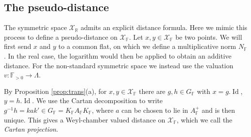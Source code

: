 \documentclass[12pt]{amsart}
\newcommand{\F}{\mathbb{F} }
\newcommand{\R}{\mathbb{R} }
\newcommand{\X}{\mathcal{X}}
\newcommand{\Ap}{A^+}
\newcommand{\ApF}{A_\F^+}
\newcommand{\Id}{\operatorname{Id} }
\numberwithin{equation}{section}
\theoremstyle{remark} %
\begin{document}
\subsection{The pseudo-distance}\label{sec:pseudodistance}

The symmetric space $\X_\R$ admits an explicit distance formula. Here we mimic this process to define a pseudo-distance on $\X_\F$. Let $x,y \in \X_\F$ be two points. We will first send $x$ and $y$ to a common flat, on which we define a multiplicative norm $N_\F$. In the real case, the logarithm would then be applied to obtain an additive distance. For the non-standard symmetric space we instead use the valuation $v \colon \F_{>0} \to \Lambda$.

By Proposition \ref{prop:trans}(a), for $x,y \in \X_\F$ there are $g,h\in G_\F$ with $x=g.\Id$, $y=h.\Id$. We use the Cartan decomposition \cite[Theorem \ref{I-thm:KAK}]{AppAGRCF} to write $g^{-1}h = kak' \in G_\F = K_\F A_\F K_\F$, where $a$ can be chosen to lie in $A_\F^+$ and is then unique. This gives a Weyl-chamber valued distance on $\X_\F$, which we call the \emph{Cartan projection}. 

\end{document}
